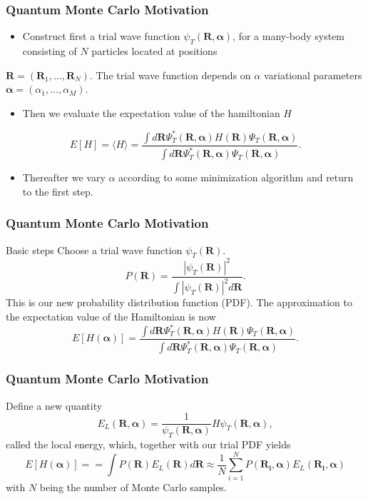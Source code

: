 \documentclass{beamer}
\begin{document}
\begin{frame}
\frametitle{Quantum Monte Carlo Motivation}

\begin{block}{}
\begin{itemize}
\item Construct first a trial wave function $\psi_T(\bm{R},\bm{\alpha})$,  for a many-body system consisting of $N$ particles located at positions 
\end{itemize}

\noindent
$\bm{R}=(\bm{R}_1,\dots ,\bm{R}_N)$. The trial wave function depends on $\alpha$ variational parameters $\bm{\alpha}=(\alpha_1,\dots ,\alpha_M)$.
\begin{itemize}
\item Then we evaluate the expectation value of the hamiltonian $H$ 
\end{itemize}

\noindent
\[
   E[H]=\langle H \rangle =
   \frac{\int d\bm{R}\Psi^{\ast}_{T}(\bm{R},\bm{\alpha})H(\bm{R})\Psi_{T}(\bm{R},\bm{\alpha})}
        {\int d\bm{R}\Psi^{\ast}_{T}(\bm{R},\bm{\alpha})\Psi_{T}(\bm{R},\bm{\alpha})}.
\]
\begin{itemize}
\item Thereafter we vary $\alpha$ according to some minimization algorithm and return to the first step.
\end{itemize}

\noindent
\end{block}
\end{frame}

\begin{frame}
\frametitle{Quantum Monte Carlo Motivation}

\begin{block}{Basic steps }
Choose a trial wave function
$\psi_T(\bm{R})$.
\[
   P(\bm{R})= \frac{\left|\psi_T(\bm{R})\right|^2}{\int \left|\psi_T(\bm{R})\right|^2d\bm{R}}.
\]
This is our new probability distribution function  (PDF).
The approximation to the expectation value of the Hamiltonian is now 
\[
   E[H(\bm{\alpha})] = 
   \frac{\int d\bm{R}\Psi^{\ast}_T(\bm{R},\bm{\alpha})H(\bm{R})\Psi_T(\bm{R},\bm{\alpha})}
        {\int d\bm{R}\Psi^{\ast}_T(\bm{R},\bm{\alpha})\Psi_T(\bm{R},\bm{\alpha})}.
\]
\end{block}
\end{frame}

\begin{frame}
\frametitle{Quantum Monte Carlo Motivation}

\begin{block}{}
Define a new quantity
\[
   E_L(\bm{R},\bm{\alpha})=\frac{1}{\psi_T(\bm{R},\bm{\alpha})}H\psi_T(\bm{R},\bm{\alpha}),
   \label{eq:locale1}
\]
called the local energy, which, together with our trial PDF yields
\[
  E[H(\bm{\alpha})]= = \int P(\bm{R})E_L(\bm{R}) d\bm{R}\approx \frac{1}{N}\sum_{i=1}^NP(\bm{R_i},\bm{\alpha})E_L(\bm{R_i},\bm{\alpha})
  \label{eq:vmc1}
\]
with $N$ being the number of Monte Carlo samples.
\end{block}
\end{frame}
\end{document}
